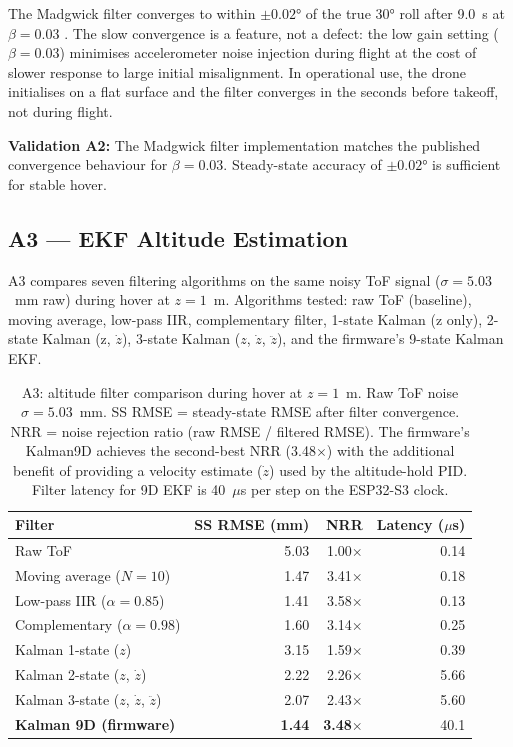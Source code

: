 The Madgwick filter converges to within $\pm 0.02°$ of the true 30° roll after
9.0~s at $\beta = 0.03$ \cite{madgwick2010filter}. The slow convergence is
a feature, not a defect: the low gain setting ($\beta = 0.03$) minimises
accelerometer noise injection during flight at the cost of slower response to
large initial misalignment. In operational use, the drone initialises on a
flat surface and the filter converges in the seconds before takeoff, not
during flight.

\textbf{Validation A2:} The Madgwick filter implementation matches the
published convergence behaviour for $\beta = 0.03$.
Steady-state accuracy of $\pm 0.02°$ is sufficient for stable hover.

\subsection{A3 --- EKF Altitude Estimation}
\label{sec:ch3_a3}

A3 compares seven filtering algorithms on the same noisy ToF signal
($\sigma = 5.03$~mm raw) during hover at $z = 1$~m. Algorithms tested:
raw ToF (baseline), moving average, low-pass IIR, complementary filter,
1-state Kalman (z only), 2-state Kalman (z, $\dot{z}$), 3-state Kalman
($z$, $\dot{z}$, $\ddot{z}$), and the firmware's 9-state Kalman EKF.

\begin{table}[ht]
  \caption{A3: altitude filter comparison during hover at $z = 1$~m.
    Raw ToF noise $\sigma = 5.03$~mm. SS RMSE = steady-state RMSE after
    filter convergence. NRR = noise rejection ratio (raw RMSE / filtered RMSE).
    The firmware's Kalman9D achieves the second-best NRR (3.48$\times$) with
    the additional benefit of providing a velocity estimate
    ($\dot{z}$) used by the altitude-hold PID. Filter latency for 9D EKF
    is 40~$\mu$s per step on the ESP32-S3 clock.}
  \label{tab:ch3_a3}
  \centering
  \small
  \begin{tabular}{lrrr}
    \toprule
    Filter & SS RMSE (mm) & NRR & Latency ($\mu$s) \\
    \midrule
    Raw ToF                             & 5.03 & 1.00$\times$  & 0.14 \\
    Moving average ($N=10$)             & 1.47 & 3.41$\times$  & 0.18 \\
    Low-pass IIR ($\alpha=0.85$)        & 1.41 & 3.58$\times$  & 0.13 \\
    Complementary ($\alpha=0.98$)       & 1.60 & 3.14$\times$  & 0.25 \\
    Kalman 1-state ($z$)                & 3.15 & 1.59$\times$  & 0.39 \\
    Kalman 2-state ($z$, $\dot{z}$)     & 2.22 & 2.26$\times$  & 5.66 \\
    Kalman 3-state ($z$, $\dot{z}$, $\ddot{z}$) & 2.07 & 2.43$\times$ & 5.60 \\
    \textbf{Kalman 9D (firmware)}       & \textbf{1.44} & \textbf{3.48$\times$} & 40.1 \\
    \bottomrule
  \end{tabular}
\end{table}

